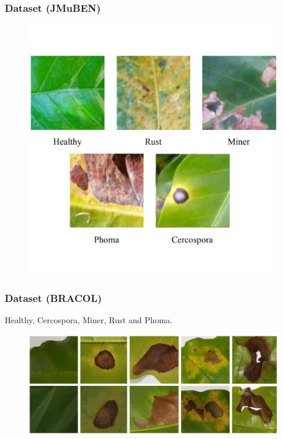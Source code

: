 \documentclass[aspectratio=169]{beamer}
\begin{document}



\begin{frame}
    \frametitle{Dataset (JMuBEN)}


    \begin{figure}
        \centering
        \includegraphics[scale = 0.3]{img/classes.png}
        \label{fig:enter-label}
    \end{figure}

\end{frame}






\begin{frame}
    \frametitle{Dataset (BRACOL)}
    \centering
    Healthy, Cercospora, Miner, Rust and Phoma.
    \begin{figure}
        \centering
        \includegraphics[scale = 0.27]{img/SintomDatasetExample.png}
        \label{fig:enter-label}
    \end{figure}

\end{frame}
\end{document}
